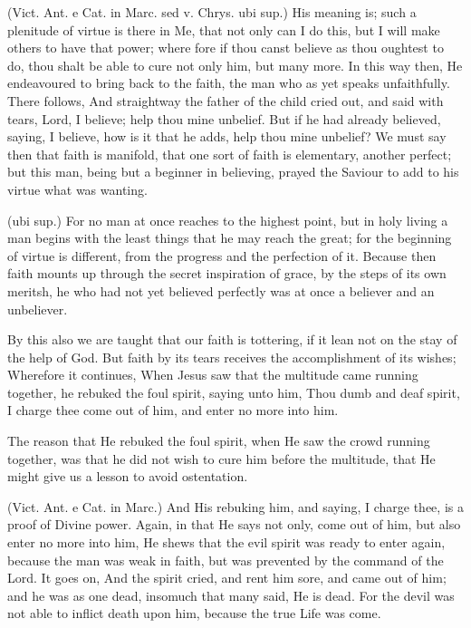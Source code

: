  (Vict. Ant. e Cat. in Marc. sed v. Chrys. ubi sup.) His meaning is; such a plenitude of virtue is there in Me, that not only can I do this, but I will make others to have that power; where fore if thou canst believe as thou oughtest to do, thou shalt be able to cure not only him, but many more. In this way then, He endeavoured to bring back to the faith, the man who as yet speaks unfaithfully. There follows, And straightway the father of the child cried out, and said with tears, Lord, I believe; help thou mine unbelief. But if he had already believed, saying, I believe, how is it that he adds, help thou mine unbelief? We must say then that faith is manifold, that one sort of faith is elementary, another perfect; but this man, being but a beginner in believing, prayed the Saviour to add to his virtue what was wanting.

 (ubi sup.) For no man at once reaches to the highest point, but in holy living a man begins with the least things that he may reach the great; for the beginning of virtue is different, from the progress and the perfection of it. Because then faith mounts up through the secret inspiration of grace, by the steps of its own meritsh, he who had not yet believed perfectly was at once a believer and an unbeliever.

 By this also we are taught that our faith is tottering, if it lean not on the stay of the help of God. But faith by its tears receives the accomplishment of its wishes; Wherefore it continues, When Jesus saw that the multitude came running together, he rebuked the foul spirit, saying unto him, Thou dumb and deaf spirit, I charge thee come out of him, and enter no more into him.

 The reason that He rebuked the foul spirit, when He saw the crowd running together, was that he did not wish to cure him before the multitude, that He might give us a lesson to avoid ostentation.

 (Vict. Ant. e Cat. in Marc.) And His rebuking him, and saying, I charge thee, is a proof of Divine power. Again, in that He says not only, come out of him, but also enter no more into him, He shews that the evil spirit was ready to enter again, because the man was weak in faith, but was prevented by the command of the Lord. It goes on, And the spirit cried, and rent him sore, and came out of him; and he was as one dead, insomuch that many said, He is dead. For the devil was not able to inflict death upon him, because the true Life was come.


